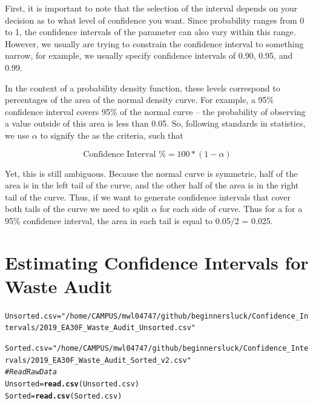 \documentclass{tufte-handout}\usepackage[]{graphicx}\usepackage[]{color}
\makeatletter
\newcommand{\hlstr}[1]{\textcolor[rgb]{0.192,0.494,0.8}{#1}}%
\newcommand{\hlcom}[1]{\textcolor[rgb]{0.678,0.584,0.686}{\textit{#1}}}%
\newcommand{\hlstd}[1]{\textcolor[rgb]{0.345,0.345,0.345}{#1}}%
\newcommand{\hlkwb}[1]{\textcolor[rgb]{0.69,0.353,0.396}{#1}}%
\newcommand{\hlkwd}[1]{\textcolor[rgb]{0.737,0.353,0.396}{\textbf{#1}}}%
\newenvironment{kframe}{%
 \def\at@end@of@kframe{}%
 \ifinner\ifhmode%
  \def\at@end@of@kframe{\end{minipage}}%
  \begin{minipage}{\columnwidth}%
 \fi\fi%
 \def\FrameCommand##1{\hskip\@totalleftmargin \hskip-\fboxsep
 \colorbox{shadecolor}{##1}\hskip-\fboxsep
     \hskip-\linewidth \hskip-\@totalleftmargin \hskip\columnwidth}%
 \MakeFramed {\advance\hsize-\width
   \@totalleftmargin\z@ \linewidth\hsize
   \@setminipage}}%
 {\par\unskip\endMakeFramed%
 \at@end@of@kframe}
\newenvironment{knitrout}{}{} %
\makeatother
\begin{document}
First, it is important to note that the selection of the interval depends on your decision as to what level of confidence you want. Since probability ranges from 0 to 1, the confidence intervals of the parameter can also vary within this range. However, we usually are trying to constrain the confidence interval to something narrow, for example, we usually specify confidence intervals of 0.90, 0.95, and 0.99. 


In the context of a probability density function, these levels correspond to percentages of the area of the normal density curve. For example, a 95\% confidence interval covers 95\% of the normal curve -- the probability of observing a value outside of this area is less than 0.05. So, following standards in statistics, we use $\alpha$ to signify the as the criteria, such that

\begin{equation}
\textrm{Confidence Interval \% } = 100 * (1-\alpha)
\end{equation}

Yet, this is still ambiguous. Because the normal curve is symmetric, half of the area is in the left tail of the curve, and the other half of the area is in the right tail of the curve. Thus, if we want to generate confidence intervals that cover both tails of the curve we need to split $\alpha$ for each side of curve. Thus for a for a 95\% confidence interval, the area in each tail is equal to 0.05/2 = 0.025. 

\section{Estimating Confidence Intervals for Waste Audit}

\begin{knitrout}
\color{fgcolor}\begin{kframe}
\begin{alltt}
\hlstd{Unsorted.csv} \hlkwb{=} \hlstr{"/home/CAMPUS/mwl04747/github/beginnersluck/Confidence_Intervals/2019_EA30F_Waste_Audit_Unsorted.csv"}

\hlstd{Sorted.csv} \hlkwb{=} \hlstr{"/home/CAMPUS/mwl04747/github/beginnersluck/Confidence_Intervals/2019_EA30F_Waste_Audit_Sorted_v2.csv"}
\hlcom{# Read Raw Data}
\hlstd{Unsorted} \hlkwb{=} \hlkwd{read.csv}\hlstd{(Unsorted.csv)}
\hlstd{Sorted} \hlkwb{=} \hlkwd{read.csv}\hlstd{(Sorted.csv)}
\end{alltt}
\end{kframe}
\end{knitrout}
\end{document}
